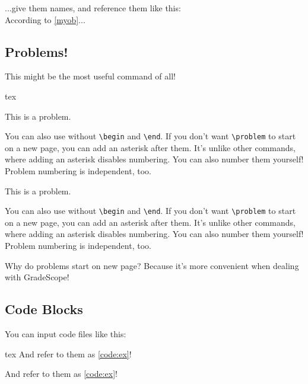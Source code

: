 \documentclass{fhw}
\begin{document}
\begin{lemma}[My lemma]
	...give them names, and reference them like this:\\
	According to \cref{myob}...
\end{lemma}

\subsection{Problems!}

This might be the most useful command of all!
\begin{Code}{tex}
\begin{problem}
  This is a problem.
\end{problem}
\problem You can also use without \verb|\begin| and \verb|\end|.
\problem* If you don't want \verb|\problem| to start on a new page, you can add an asterisk after them. It's unlike other commands, where adding an asterisk disables numbering.
\problem*[C8763 --- Starburst] You can also number them yourself!
\problem* Problem numbering is independent, too.
\end{Code}

\begin{problem}
  This is a problem.
\end{problem}
\problem You can also use without \verb|\begin| and \verb|\end|.
\problem* If you don't want \verb|\problem| to start on a new page, you can add an asterisk after them. It's unlike other commands, where adding an asterisk disables numbering.
\problem*[C8763 --- Starburst] You can also number them yourself!
\problem* Problem numbering is independent, too.

Why do problems start on new page? Because it's more convenient when dealing with GradeScope!

\subsection{Code Blocks}

You can input code files like this:

\begin{Code}{tex}
And refer to them as \cref{code:ex}!
\end{Code}

And refer to them as \cref{code:ex}!
\end{document}
